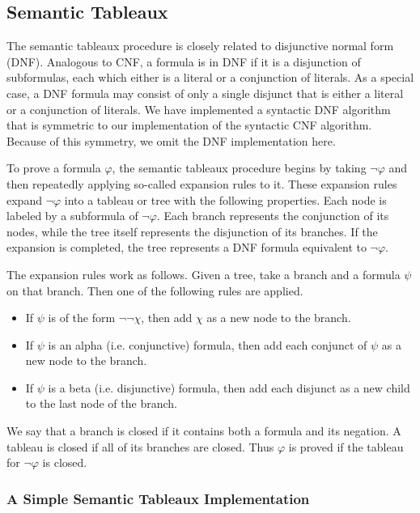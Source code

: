 \documentclass[a4paper,notitlepage]{scrartcl}
\let\phi\varphi
\begin{document}
\subsection{Semantic Tableaux}

The semantic tableaux procedure is closely related to disjunctive normal form
(DNF). Analogous to CNF, a formula is in DNF if it is a disjunction of
subformulas, each which either is a literal or a conjunction of literals. As a
special case, a DNF formula may consist of only a single disjunct that is
either a literal or a conjunction of literals. We have implemented a syntactic
DNF algorithm that is symmetric to our implementation of the syntactic CNF
algorithm. Because of this symmetry, we omit the DNF implementation here.

To prove a formula $\phi$, the semantic tableaux procedure begins by taking
$\lnot\phi$ and then repeatedly applying so-called expansion rules to it. These
expansion rules expand $\lnot\phi$ into a tableau or tree with the following
properties. Each node is labeled by a subformula of $\lnot\phi$. Each branch
represents the conjunction of its nodes, while the tree itself represents the
disjunction of its branches. If the expansion is completed, the tree represents
a DNF formula equivalent to $\lnot\phi$.

The expansion rules work as follows. Given a tree, take a branch and a formula
$\psi$ on that branch. Then one of the following rules are applied.

\begin{itemize}
\item
If $\psi$ is of the form $\lnot\lnot\chi$, then add $\chi$ as a new node to the
branch.

\item
If $\psi$ is an alpha (i.e. conjunctive) formula, then add each conjunct of
$\psi$ as a new node to the branch.

\item
If $\psi$ is a beta (i.e. disjunctive) formula, then add each disjunct as a
new child to the last node of the branch.
\end{itemize}

We say that a branch is closed if it contains both a formula and its negation.
A tableau is closed if all of its branches are closed. Thus $\phi$ is proved if
the tableau for $\lnot\phi$ is closed.

\subsubsection{A Simple Semantic Tableaux Implementation}
\end{document}
